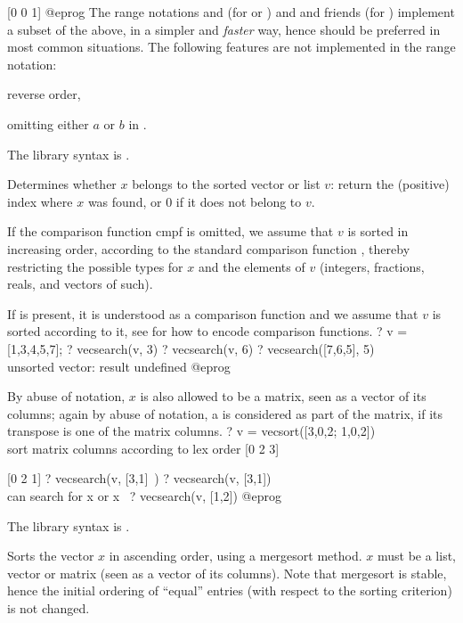 [0 0 1]
@eprog
The range notations  and  (for  or
) and  and friends (for ) implement a
subset of the above, in a simpler and \emph{faster} way, hence should be
preferred in most common situations. The following features are not
implemented in the range notation:

\item reverse order,

\item omitting either $a$ or $b$ in .

The library syntax is .

\label{se:vecsearch}
Determines whether $x$ belongs to the sorted vector or list $v$: return
the (positive) index where $x$ was found, or $0$ if it does not belong to
$v$.

If the comparison function cmpf is omitted, we assume that $v$ is sorted in
increasing order, according to the standard comparison function ,
thereby restricting the possible types for $x$ and the elements of $v$
(integers, fractions, reals, and vectors of such).

If  is present, it is understood as a comparison function and we
assume that $v$ is sorted according to it, see  for how to
encode comparison functions.
\bprog
? v = [1,3,4,5,7];
? vecsearch(v, 3)
? vecsearch(v, 6)
? vecsearch([7,6,5], 5) \\ unsorted vector: result undefined
@eprog

By abuse of notation, $x$ is also allowed to be a matrix, seen as a vector
of its columns; again by abuse of notation, a  is considered
as part of the matrix, if its transpose is one of the matrix columns.
\bprog
? v = vecsort([3,0,2; 1,0,2]) \\ sort matrix columns according to lex order
[0 2 3]

[0 2 1]
? vecsearch(v, [3,1]~)
? vecsearch(v, [3,1])  \\ can search for x or x~
? vecsearch(v, [1,2])
@eprog\noindent

The library syntax is .

\label{se:vecsort}
Sorts the vector $x$ in ascending order, using a mergesort method.
$x$ must be a list, vector or matrix (seen as a vector of its columns).
Note that mergesort is stable, hence the initial ordering of ``equal''
entries (with respect to the sorting criterion) is not changed.

